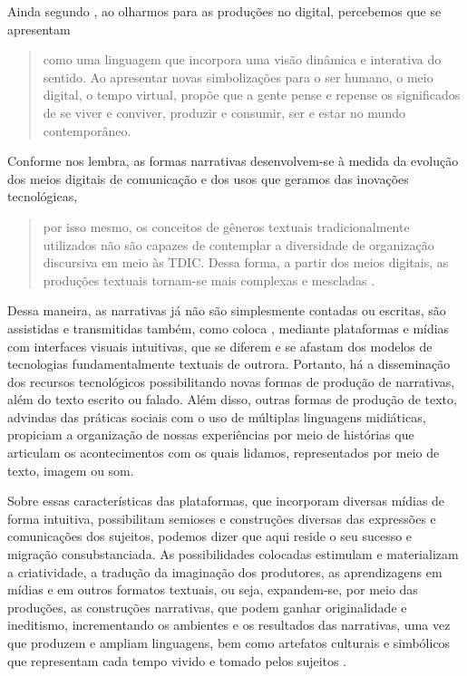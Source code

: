 \documentclass[portuguese]{textolivre}
\begin{document}
Ainda segundo \textcite[p.~93]{busatto2005narrando}, ao olharmos para as produções no digital, percebemos que se apresentam

\begin{quote}
 como uma linguagem que incorpora uma visão dinâmica e interativa do sentido. Ao apresentar novas simbolizações para o ser humano, o meio digital, o tempo virtual, propõe que a gente pense e repense os significados de se viver e conviver, produzir e consumir, ser e estar no mundo contemporâneo.   
\end{quote}

Conforme \textcite{canini2018narrativas} nos lembra, as formas narrativas desenvolvem-se à medida da evolução dos meios digitais de comunicação e dos usos que geramos das inovações tecnológicas,

\begin{quote}
    por isso mesmo, os conceitos de gêneros textuais tradicionalmente utilizados não são capazes de contemplar a diversidade de organização discursiva em meio às TDIC. Dessa forma, a partir dos meios digitais, as produções textuais tornam-se mais complexas e mescladas \cite[p.~57]{canini2018narrativas}.
\end{quote}

Dessa maneira, as narrativas já não são simplesmente contadas ou escritas, são assistidas e transmitidas também, como coloca \textcite[p.~58-59]{canini2018narrativas}, mediante plataformas e mídias com interfaces visuais intuitivas, que se diferem e se afastam dos modelos de tecnologias fundamentalmente textuais de outrora. Portanto, há a disseminação dos recursos tecnológicos possibilitando novas formas de produção de narrativas, além do texto escrito ou falado. Além disso, outras formas de produção de texto, advindas das práticas sociais com o uso de múltiplas linguagens midiáticas, propiciam a organização de nossas experiências por meio de histórias que articulam os acontecimentos com os quais lidamos, representados por meio de texto, imagem ou som.

Sobre essas características das plataformas, que incorporam diversas mídias de forma intuitiva, possibilitam semioses e construções diversas das expressões e comunicações dos sujeitos, podemos dizer que aqui reside o seu sucesso e migração consubstanciada. As possibilidades colocadas estimulam e materializam a criatividade, a tradução da imaginação dos produtores, as aprendizagens em mídias e em outros formatos textuais, ou seja, expandem-se, por meio das produções, as construções narrativas, que podem ganhar originalidade e ineditismo, incrementando os ambientes e os resultados das narrativas, uma vez que produzem e ampliam linguagens, bem como artefatos culturais e simbólicos que representam cada tempo vivido e tomado pelos sujeitos \cite{bruner1991construcao}.
\end{document}

